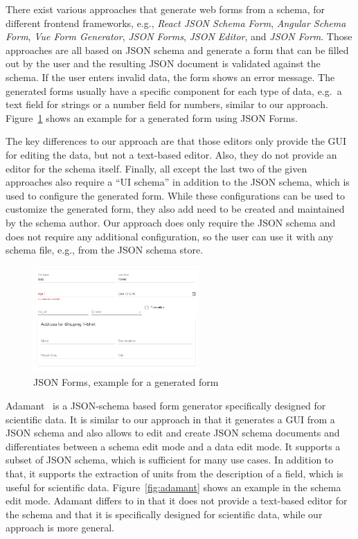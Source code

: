 There exist various approaches that generate web forms from a schema, for different frontend frameworks, e.g.,
\textit{React JSON Schema Form}\cite{githubGitHubRjsfteamreactjsonschemaform},
\textit{Angular Schema Form}\cite{githubGitHubJsonschemaformangularschemaform},
\textit{Vue Form Generator}\cite{githubGitHubVuegeneratorsvueformgenerator},
\textit{JSON Forms}\cite{jsonformsMoreForms},
\textit{JSON Editor}\cite{jsoneditoronlineJSONEditor}, and
\textit{JSON Form}\cite{githubGitHubJsonformjsonform}.
Those approaches are all based on JSON schema and generate a form that can be filled out by the user and
the resulting JSON document is validated against the schema.
If the user enters invalid data, the form shows an error message.
The generated forms usually have a specific component for each type of data, e.g.\ a text field for strings or a number field for numbers,
similar to our approach.
Figure~\ref{fig:jsonforms} shows an example for a generated form using JSON Forms.

The key differences to our approach are that those editors only provide the GUI for editing the data, but not a text-based editor.
Also, they do not provide an editor for the schema itself.
Finally, all except the last two of the given approaches also require a ``UI schema'' in addition to the JSON schema, which is used to configure the generated form.
While these configurations can be used to customize the generated form, they also add need to be created and maintained by the schema author.
Our approach does only require the JSON schema and does not require any additional configuration, so the user can
use it with any schema file, e.g., from the JSON schema store.

\begin{figure}[htb]
    \centering
    \includegraphics[width=2.5in]{figures/jsonforms}
    \caption{JSON Forms, example for a generated form}
    \label{fig:jsonforms}
\end{figure}

Adamant~\cite{siffa2022adamant} is a JSON-schema based form generator specifically designed for scientific data.
It is similar to our approach in that it generates a GUI from a JSON schema and also allows to edit and create JSON schema documents
and differentiates between a schema edit mode and a data edit mode.
It supports a subset of JSON schema, which is sufficient for many use cases.
In addition to that, it supports the extraction of units from the description of a field, which is useful for scientific data.
Figure~\ref{fig:adamant} shows an example in the schema edit mode.
Adamant differs to \toolname{} in that it does not provide a text-based editor for the schema and that it is specifically designed for scientific data,
while our approach is more general.

